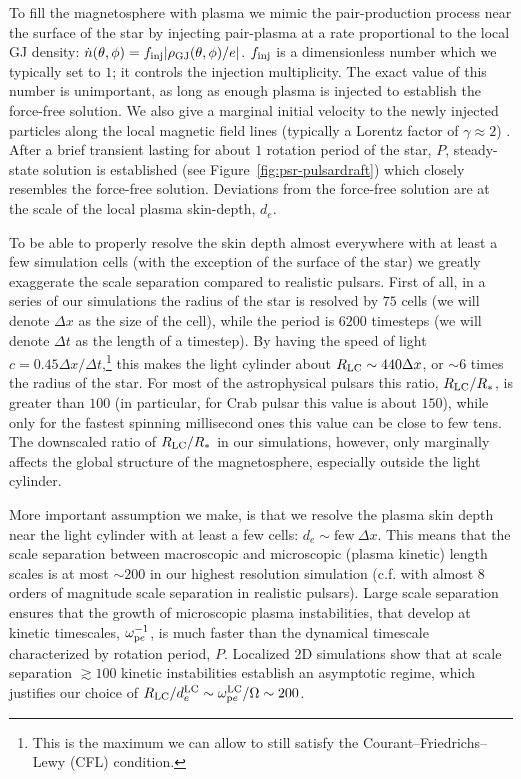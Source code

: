 To fill the magnetosphere with plasma we mimic the pair-production process near the surface of the star by injecting pair-plasma at a rate proportional to the local GJ density: $\dot{n}(\theta,\phi) = f_{\rm inj}|\rho_{\rm GJ}(\theta,\phi) / e|$. $f_{\rm inj}$ is a dimensionless number which we typically set to $1$; it controls the injection multiplicity. The exact value of this number is unimportant, as long as enough plasma is injected to establish the force-free solution. We also give a marginal initial velocity to the newly injected particles along the local magnetic field lines  (typically a Lorentz factor of $\gamma\approx 2$) \citep[similar technique has been previously used by][]{2015MNRAS.448..606C, 2015MNRAS.449.2759B}. After a brief transient lasting for about $1$ rotation period of the star, $P$, steady-state solution is established (see Figure~\ref{fig:psr-pulsardraft}) which closely resembles the force-free solution. Deviations from the force-free solution are at the scale of the local plasma skin-depth, $d_{e}$. 

To be able to properly resolve the skin depth almost everywhere with at least a few simulation cells (with the exception of the surface of the star) we greatly exaggerate the scale separation compared to realistic pulsars. First of all, in a series of our simulations the radius of the star is resolved by $75$ cells (we will denote $\Delta x$ as the size of the cell), while the period is $6200$ timesteps (we will denote $\Delta t$ as the length of a timestep). By having the speed of light $c=0.45\Delta x/\Delta t$,\footnote{This is the maximum we can allow to still satisfy the Courant–Friedrichs–Lewy (CFL) condition.} this makes the light cylinder about $R_{\rm LC}\sim 440\Delta x$, or $\sim 6$ times the radius of the star. For most of the astrophysical pulsars this ratio, $R_{\rm LC}/R_*$, is greater than $100$ (in particular, for Crab pulsar this value is about $150$), while only for the fastest spinning millisecond ones this value can be close to few tens. The downscaled ratio of $R_{\rm LC}/R_*$ in our simulations, however, only marginally affects the global structure of the magnetosphere, especially outside the light cylinder. 

More important assumption we make, is that we resolve the plasma skin depth near the light cylinder with at least a few cells: $d_e\sim \text{few}~\Delta x$. This means that the scale separation between macroscopic and microscopic (plasma kinetic) length scales is at most $\sim200$ in our highest resolution simulation (c.f. with almost $8$ orders of magnitude scale separation in realistic pulsars). Large scale separation ensures that the growth of microscopic plasma instabilities, that develop at kinetic timescales, $\omega_{{\rm p}e}^{-1}$, is much faster than the dynamical timescale characterized by rotation period, $P$. Localized 2D simulations \citep[see, e.g.,][]{2016ApJ...816L...8W} show that at scale separation $\gtrsim 100$ kinetic instabilities establish an asymptotic regime, which justifies our choice of $R_{\rm LC} / d_e^{\rm LC} \sim \omega_{{\rm p}e}^{\rm LC}/\Omega \sim 200$. 


